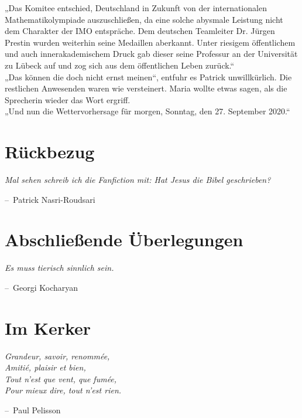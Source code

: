 \documentclass[oneside]{memoir}
\makeatletter
\newenvironment{chapquote}[2][2em]
  {\setlength{\@tempdima}{#1}%
   \def\chapquote@author{#2}%
   \parshape 1 \@tempdima \dimexpr\textwidth-2\@tempdima\relax%
   \itshape}
  {\par\normalfont\hfill--\ \chapquote@author\hspace*{\@tempdima}\par\bigskip}
\makeatother
\begin{document}
„Das Komitee entschied, Deutschland in Zukunft von der internationalen Mathematikolympiade auszuschließen, da eine solche abysmale Leistung nicht dem Charakter der IMO entspräche. Dem deutschen Teamleiter Dr. Jürgen Prestin wurden weiterhin seine Medaillen aberkannt. Unter riesigem öffentlichem und auch innerakademischem Druck gab dieser seine Professur an der Universität zu Lübeck auf und zog sich aus dem öffentlichen Leben zurück.“ \\
„Das können die doch nicht ernst meinen“, entfuhr es Patrick unwillkürlich. Die restlichen Anwesenden waren wie versteinert. Maria wollte etwas sagen, als die Sprecherin wieder das Wort ergriff. \\
„Und nun die Wettervorhersage für morgen, Sonntag, den 27. September 2020.“

     
     \bigskip \bigskip \bigskip \bigskip

\chapter{Rückbezug} %
\begin{chapquote}{Patrick Nasri-Roudsari}
\glqq Mal sehen schreib ich die Fanfiction mit: Hat Jesus die Bibel geschrieben?\grqq
\end{chapquote}

\chapter{Abschließende Überlegungen} %
\begin{chapquote}{Georgi Kocharyan}
\glqq Es muss tierisch sinnlich sein.\grqq
\end{chapquote}


  \bigskip \bigskip \bigskip \bigskip
     
     
\chapter{Im Kerker} %
\begin{chapquote}{Paul Pelisson}
\glqq Grandeur, savoir, renommée, \\
Amitié, plaisir et bien, \\
Tout n’est que vent, que fumée, \\
Pour mieux dire, tout n’est rien. 
\grqq
\end{chapquote}
\end{document}
